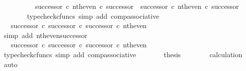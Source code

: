 \begin{isabellebody}
\ \ \isamarkupfalse%
\ {\isacharminus}{\kern0pt}\isanewline
\ \ \ \ \isamarkupfalse%
\ {\isachardoublequoteopen}{\isacharparenleft}{\kern0pt}successor\ {\isasymcirc}\isactrlsub c\ nth{\isacharunderscore}{\kern0pt}even{\isacharparenright}{\kern0pt}\ {\isasymcirc}\isactrlsub c\ successor\ {\isacharequal}{\kern0pt}\ successor\ {\isasymcirc}\isactrlsub c\ nth{\isacharunderscore}{\kern0pt}even\ {\isasymcirc}\isactrlsub c\ successor{\isachardoublequoteclose}\isanewline
\ \ \ \ \ \ \isamarkupfalse%
\ {\isacharparenleft}{\kern0pt}typecheck{\isacharunderscore}{\kern0pt}cfuncs{\isacharcomma}{\kern0pt}\ simp\ add{\isacharcolon}{\kern0pt}\ comp{\isacharunderscore}{\kern0pt}associative{}{\isacharparenright}{\kern0pt}\isanewline
\ \ \ \ \isamarkupfalse%
\ \isamarkupfalse%
\ {\isachardoublequoteopen}{\isachardot}{\kern0pt}{\isachardot}{\kern0pt}{\isachardot}{\kern0pt}\ {\isacharequal}{\kern0pt}\ successor\ {\isasymcirc}\isactrlsub c\ successor\ {\isasymcirc}\isactrlsub c\ successor\ {\isasymcirc}\isactrlsub c\ nth{\isacharunderscore}{\kern0pt}even{\isachardoublequoteclose}\isanewline
\ \ \ \ \ \ \isamarkupfalse%
\ {\isacharparenleft}{\kern0pt}simp\ add{\isacharcolon}{\kern0pt}\ nth{\isacharunderscore}{\kern0pt}even{\isacharunderscore}{\kern0pt}successor{}{\isacharparenright}{\kern0pt}\isanewline
\ \ \ \ \isamarkupfalse%
\ \isamarkupfalse%
\ {\isachardoublequoteopen}{\isachardot}{\kern0pt}{\isachardot}{\kern0pt}{\isachardot}{\kern0pt}\ {\isacharequal}{\kern0pt}\ {\isacharparenleft}{\kern0pt}successor\ {\isasymcirc}\isactrlsub c\ successor{\isacharparenright}{\kern0pt}\ {\isasymcirc}\isactrlsub c\ successor\ {\isasymcirc}\isactrlsub c\ nth{\isacharunderscore}{\kern0pt}even{\isachardoublequoteclose}\isanewline
\ \ \ \ \ \ \isamarkupfalse%
\ {\isacharparenleft}{\kern0pt}typecheck{\isacharunderscore}{\kern0pt}cfuncs{\isacharcomma}{\kern0pt}\ simp\ add{\isacharcolon}{\kern0pt}\ comp{\isacharunderscore}{\kern0pt}associative{}{\isacharparenright}{\kern0pt}\isanewline
\ \ \ \ \isamarkupfalse%
\ \isamarkupfalse%
\ {\isacharquery}{\kern0pt}thesis\isanewline
\ \ \ \ \ \ \isamarkupfalse%
\ calculation\ \isamarkupfalse%
\ auto\isanewline
\ \ \isamarkupfalse%
\isanewline
{}\isamarkupfalse%
%
\endisatagproof
{\isafoldproof}%
%
\isadelimproof
\isanewline
%
\endisadelimproof
\isanewline
{}\isamarkupfalse%

\end{isabellebody}
